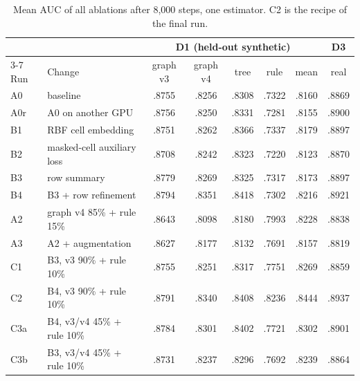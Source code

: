 \documentclass[11pt]{article}
\begin{document}
\begin{table}[t]
\centering
\small
\begin{tabular}{llcccccc}
\toprule
& & \multicolumn{5}{c}{D1 (held-out synthetic)} & D3 \\
\cmidrule(lr){3-7}
Run & Change & graph v3 & graph v4 & tree & rule & mean & real \\
\midrule
A0  & baseline                          & .8755 & .8256 & .8308 & .7322 & .8160 & .8869 \\
A0r & A0 on another GPU                 & .8756 & .8250 & .8331 & .7281 & .8155 & .8900 \\
B1  & RBF cell embedding                & .8751 & .8262 & .8366 & .7337 & .8179 & .8897 \\
B2  & masked-cell auxiliary loss        & .8708 & .8242 & .8323 & .7220 & .8123 & .8870 \\
B3  & row summary                       & .8779 & .8269 & .8325 & .7317 & .8173 & .8897 \\
B4  & B3 + row refinement               & .8794 & .8351 & .8418 & .7302 & .8216 & .8921 \\
A2  & graph v4 85\% + rule 15\%         & .8643 & .8098 & .8180 & .7993 & .8228 & .8838 \\
A3  & A2 + augmentation                 & .8627 & .8177 & .8132 & .7691 & .8157 & .8819 \\
C1  & B3, v3 90\% + rule 10\%           & .8755 & .8251 & .8317 & .7751 & .8269 & .8859 \\
\rowcolor{orange!12}
C2  & B4, v3 90\% + rule 10\%           & .8791 & .8340 & .8408 & .8236 & .8444 & .8937 \\
C3a & B4, v3/v4 45\% + rule 10\%        & .8784 & .8301 & .8402 & .7721 & .8302 & .8901 \\
C3b & B3, v3/v4 45\% + rule 10\%        & .8731 & .8237 & .8296 & .7692 & .8239 & .8864 \\
\bottomrule
\end{tabular}
\caption{Mean AUC of all ablations after 8,000 steps, one estimator. C2 is the recipe of the final
run.}
\label{tab:abs}
\end{table}
\end{document}
